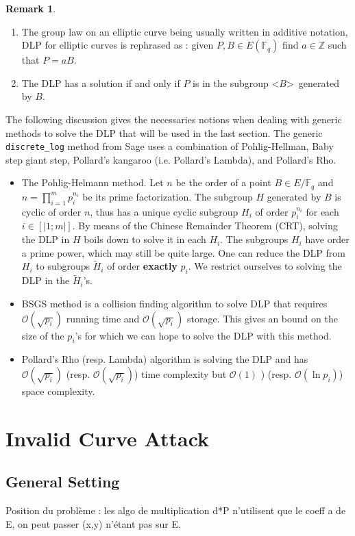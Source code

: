 \documentclass[10pt]{article}
\theoremstyle{definition}
\newtheorem{remark}{Remark}
\newcommand{\F}{\mathbb{F}}
\newcommand{\Z}{\mathbb{Z}}
\begin{document}
\noindent \begin{remark}
\begin{enumerate}
\item The group law on an elliptic curve being usually written in additive notation, DLP for elliptic curves is rephrased as : given $P,B \in E(\F_q)$ find $a \in \Z$ such that $P = aB$.
\item The DLP has a solution if and only if $P$ is in the subgroup \textless$B$\textgreater~generated by $B$.
\end{enumerate}
\end{remark}

The following discussion gives the necessaries notions when dealing with generic methods to solve the DLP that will be used in the last section.
The generic \verb|discrete_log| method from Sage uses a combination of Pohlig-Hellman, Baby step giant step, Pollard’s kangaroo (i.e. Pollard's Lambda), and Pollard’s Rho. 

\begin{itemize}
\item The Pohlig-Helmann method.
Let $n$ be the order of a point $B \in E/\F_q$ and  $n = \prod_{i = 1}^m p_i^{n_i}$ be its prime factorization.
The subgroup $H$ generated by $B$ is cyclic of order $n$, thus has a unique cyclic subgroup $H_i$ of order $p_i^{n_i}$ for each $i \in [| 1; m|]$.
By means of the Chinese Remainder Theorem (CRT), solving the DLP in $H$ boils down to solve it in each $H_i$. 
The subgroups $H_i$ have order a prime power, which may still be quite large. 
One can reduce the DLP from $H_i$ to subgroups $\tilde{H}_i$ of order \textbf{exactly} $p_i$.
We restrict ourselves to solving the DLP in the $\tilde{H}_i$'s.
\item BSGS method is a collision finding algorithm to solve DLP that requires $\mathcal{O}(\sqrt{p_i})$ running time and $\mathcal{O}(\sqrt{p_i})$ storage.
This gives an bound on the size of the $p_i$'s for which we can hope to solve the DLP with this method.
\item Pollard's Rho (resp. Lambda) algorithm is solving the DLP and has $\mathcal{O}(\sqrt{p_i})$ (resp. $\mathcal{O}(\sqrt{p_i})$) time complexity but $\mathcal{O}(1)$ ) (resp. $\mathcal{O}(\ln{p_i})$) space complexity.
\end{itemize}

\section{Invalid Curve Attack}
\subsection{General Setting}
Position du problème : les algo de multiplication d*P n'utilisent que le coeff a de E, on peut passer (x,y) n'étant pas sur E.
\end{document}
